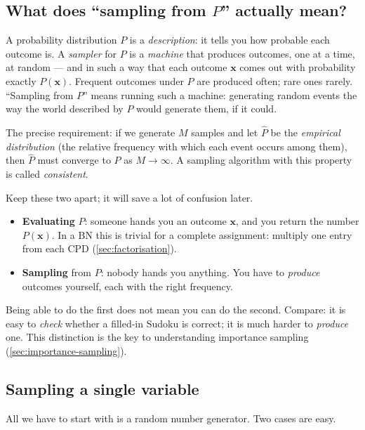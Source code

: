 \documentclass[11pt, oneside]{book}
\newcommand{\bx}{\mathbf{x}}  \newcommand{\by}{\mathbf{y}}
\let\originalsubsection\subsection
\renewcommand{\subsection}{\Needspace{6\baselineskip}\originalsubsection}
\begin{document}
\subsection{What does ``sampling from \texorpdfstring{$P$}{P}'' actually mean?}

A probability distribution $P$ is a \emph{description}: it tells you how
probable each outcome is. A \emph{sampler} for $P$ is a \emph{machine} that
produces outcomes, one at a time, at random --- and in such a way that each
outcome $\bx$ comes out with probability exactly $P(\bx)$. Frequent outcomes
under $P$ are produced often; rare ones rarely. ``Sampling from $P$'' means
running such a machine: generating random events the way the world described
by $P$ would generate them, if it could.

The precise requirement: if we generate $M$ samples and let $\hat P$ be the
\emph{empirical distribution} (the relative frequency with which each event
occurs among them), then $\hat P$ must converge to $P$ as $M \to \infty$. A
sampling algorithm with this property is called \emph{consistent}.

\begin{intbox}[title={Evaluating vs.\ sampling --- two very different skills}, unbreakable]
Keep these two apart; it will save a lot of confusion later.
\begin{itemize}
  \item \textbf{Evaluating} $P$: someone hands you an outcome $\bx$, and you
    return the number $P(\bx)$. In a BN this is trivial for a complete
    assignment: multiply one entry from each CPD (\cref{sec:factorisation}).
  \item \textbf{Sampling} from $P$: nobody hands you anything. You have to
    \emph{produce} outcomes yourself, each with the right frequency.
\end{itemize}
Being able to do the first does not mean you can do the second. Compare: it
is easy to \emph{check} whether a filled-in Sudoku is correct; it is much
harder to \emph{produce} one. This distinction is the key to understanding
importance sampling (\cref{sec:importance-sampling}).
\end{intbox}

\subsection{Sampling a single variable}

All we have to start with is a random number generator. Two cases are easy.
\end{document}
